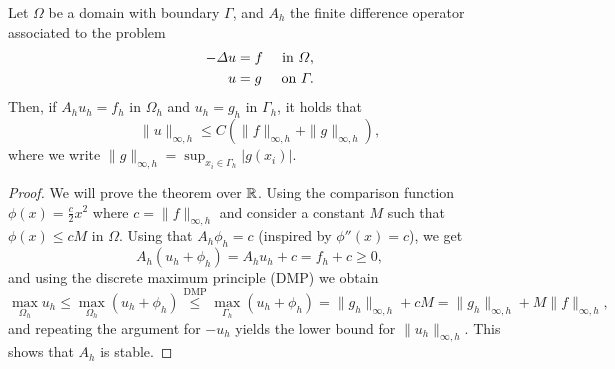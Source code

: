 \begin{theorem}
    Let $\Omega$ be a domain with boundary $\Gamma$, and $A_h$ the finite difference operator associated to the problem
    \begin{equation}
        \begin{aligned}
            -\Delta u &= f & \text{ in } \Omega, \\
            u &= g & \text{ on } \Gamma.
        \end{aligned}
    \end{equation}
    Then, if $A_h u_h = f_h$ in $\Omega_h$ and $u_h = g_h$ in $\Gamma_h$, it holds that
    \begin{equation}
        \|u\|_{\infty,h} \leq C\left(\|f\|_{\infty, h} + \|g\|_{\infty, h}\right),
    \end{equation}
    where we write $\|g\|_{\infty, h} = \sup_{x_i\in\Gamma_h}|g(x_i)|$. 
    \begin{proof}
        We will prove the theorem over $\mathbb{R}$. Using the comparison function $\phi(x) = \frac{c}{2}x^2$ where $c=\|f\|_{\infty, h}$ and consider a constant $M$ such that $\phi(x) \leq cM$ in $\Omega$. Using that $A_h \phi_h = c$ (inspired by $\phi''(x) = c$), we get
        \begin{equation*}
            A_h(u_h + \phi_h) = A_h u_h + c = f_h + c \geq 0,
        \end{equation*}
        and using the discrete maximum principle (DMP) we obtain
        \begin{equation*}
            \max_{\Omega_h} u_h \leq \max_{\Omega_h} (u_h + \phi_h) \overset{\text{DMP}}{\leq} \max_{\Gamma_h} (u_h + \phi_h) = \|g_h\|_{\infty, h} + cM = \|g_h\|_{\infty, h} + M \|f\|_{\infty, h},
        \end{equation*}
        and repeating the argument for $-u_h$ yields the lower bound for $\|u_h\|_{\infty,h}$. This shows that $A_h$ is stable.
    \end{proof}
\end{theorem}

